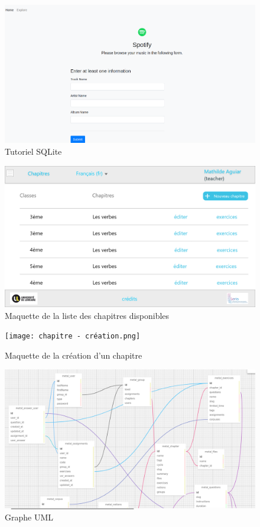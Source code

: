 \documentclass[12pt]{article}
\begin{document}
\begin{figure}
    \centering
    \includegraphics[scale=0.3]{tuto_sqlite.png}
    \caption{Tutoriel SQLite}
    \label{fig:tuto_sqlite}
\end{figure}

\begin{figure}
    \centering
    \includegraphics[scale=0.27]{Chapitres.png}
    \caption{Maquette de la liste des chapitres disponibles}
    \label{fig:maquette1}
\end{figure}

\begin{figure}
    \centering
    \texttt{[image: chapitre - création.png]}
    \caption{Maquette de la création d'un chapitre}
    \label{fig:mquette2}
\end{figure}


\begin{figure}
    \centering
    \includegraphics[scale=0.3]{uml1.png}
    \caption{Graphe UML}
    \label{fig:UML1}
\end{figure}
\end{document}
